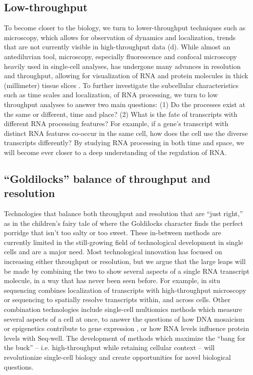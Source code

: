\subsection{Low-throughput}

To become closer to the biology, we turn to lower-throughput techniques such as microscopy, which allows for observation of dynamics and localization, trends that are not currently visible in high-throughput data (d). While almost an antediluvian tool, microscopy, especially fluorescence and confocal microscopy heavily used in single-cell analyses, has undergone many advances in resolution and throughput, allowing for visualization of RNA and protein molecules in thick (millimeter) tissue slices \cite{Buxbaum2015-eu,Shah2016-ut,Treweek2015-ri,Yang2014-xq}. To further investigate the subcellular characteristics such as time scales and localization, of RNA processing, we turn to low throughput analyses to answer two main questions: (1) Do the processes exist at the same or different, time and place? (2) What is the fate of transcripts with different RNA processing features? For example, if a gene's transcript with distinct RNA features co-occur in the same cell, how does the cell use the diverse transcripts differently? By studying RNA processing in both time and space, we will become ever closer to a deep understanding of the regulation of RNA.

\subsection{``Goldilocks'' balance of throughput and resolution}

Technologies that balance both throughput and resolution that are ``just right,'' as in the children's fairy tale of where the Goldilocks character finds the perfect porridge that isn't too salty or too sweet. These in-between methods are currently limited in the still-growing field of technological development in single cells and are a major need. Most technological innovation has focused on increasing either throughput or resolution, but we argue that the large leaps will be made by combining the two to show several aspects of a single RNA transcript molecule, in a way that has never been seen before. For example, in situ sequencing
 \cite{Chen2015-pv,Crosetto2015-hf,Ke2013-iu,Lee2015-fj,Lubeck2014-re,Shah2016-ut,Shah2016-sn} combines localization of transcripts with high-throughput microscopy or sequencing to spatially resolve transcripts within, and across cells. Other combination technologies include single-cell multiomics methods which measure several aspects of a cell at once, to answer the questions of how DNA mosaicism or epigenetics contribute to gene expression  \cite{Angermueller2016-rx,Hou2016-zi,Macaulay2017-tb,Reuter2016-op}, or how RNA levels influence protein levels with Seq-well. The development of methods which maximize the ``bang for the buck'' -- i.e. high-throughput while retaining cellular context -- will revolutionize single-cell biology and create opportunities for novel biological questions.

